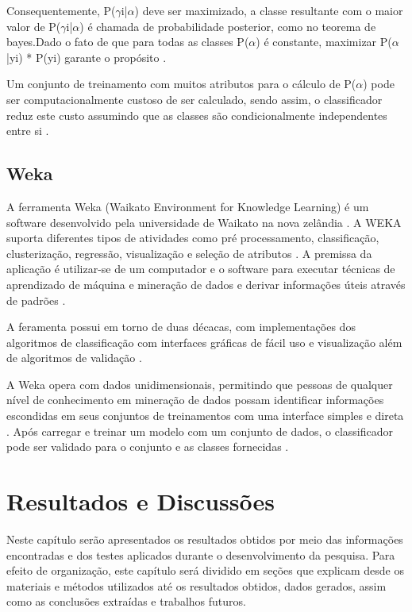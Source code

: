 \documentclass[
	12pt,				%
	oneside,			%
	a4paper,			%
	english,			%
	brazil				%
	]{abntex2ppgsi}
\begin{document}
Consequentemente, P($\gamma$i|$\alpha$)  deve ser maximizado, a classe resultante com o maior valor de P($\gamma$i|$\alpha$)  é chamada de probabilidade posterior, como no teorema de bayes.Dado o fato de que para todas as classes P($\alpha$) é constante, maximizar P($\alpha$|yi) * P(yi) garante o propósito \cite{ sharma2015}.

Um conjunto de treinamento com muitos atributos para o cálculo de P($\alpha$) pode ser computacionalmente custoso de ser calculado, sendo assim, o classificador reduz este custo assumindo que as classes são condicionalmente independentes entre si \cite{ sharma2015}.


\section{Weka}
A ferramenta Weka (Waikato Environment for Knowledge Learning) é um software desenvolvido pela universidade de Waikato na nova zelândia \cite{Subbulakshmi2012}.  A WEKA suporta diferentes tipos de atividades como pré processamento, classificação, clusterização, regressão, visualização e seleção de atributos \cite{Subbulakshmi2012}. A premissa da aplicação é utilizar-se de um computador e o software para executar técnicas de aprendizado de máquina e mineração de dados e derivar informações úteis através de padrões \cite{Subbulakshmi2012}.

A feramenta possui em torno de duas décacas, com  implementações dos algoritmos de classificação com interfaces gráficas de fácil uso e visualização além de algoritmos de validação \cite{Bouckaert2008}. 

A Weka opera com dados unidimensionais, permitindo que pessoas de qualquer nível de conhecimento em mineração de dados  possam identificar informações escondidas em seus conjuntos de treinamentos com uma interface simples e direta \cite{Subbulakshmi2012}.  Após carregar e treinar um modelo com um conjunto de dados, o classificador pode ser validado para o conjunto e as classes fornecidas \cite{Subbulakshmi2012}. 

\chapter{Resultados e Discussões}
\label{chap:resultados}
Neste capítulo serão apresentados os resultados obtidos por meio das informações encontradas e dos testes aplicados durante o desenvolvimento da pesquisa. Para efeito de organização, este capítulo será dividido em seções que explicam desde os materiais e métodos utilizados até os resultados obtidos, dados gerados, assim como as conclusões extraídas e trabalhos futuros.
\end{document}
